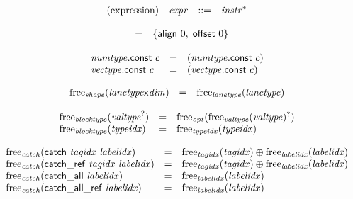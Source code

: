 \vspace{1ex}

$$
\begin{array}[t]{@{}lrrl@{}l@{}}
\mbox{(expression)} & {\mathit{expr}} & ::= & {{\mathit{instr}}^\ast} \\
\end{array}
$$

\vspace{1ex}

\vspace{1ex}

$$
\begin{array}[t]{@{}lcl@{}l@{}}
& = & \{ \mathsf{align}~0,\;\allowbreak \mathsf{offset}~0 \} \\
\end{array}
$$

$$
\begin{array}[t]{@{}lcl@{}l@{}}
{\mathit{numtype}}{.}\mathsf{const}~c & = & ({\mathit{numtype}}{.}\mathsf{const}~c) \\
{\mathit{vectype}}{.}\mathsf{const}~c & = & ({\mathit{vectype}}{.}\mathsf{const}~c) \\
\end{array}
$$

\vspace{1ex}

\vspace{1ex}

$$
\begin{array}[t]{@{}lcl@{}l@{}}
{\mathrm{free}}_{\mathit{shape}}({{\mathit{lanetype}}}{\mathsf{x}}{{\mathit{dim}}}) & = & {\mathrm{free}}_{\mathit{lanetype}}({\mathit{lanetype}}) \\
\end{array}
$$

$$
\begin{array}[t]{@{}lcl@{}l@{}}
{\mathrm{free}}_{\mathit{blocktype}}({{\mathit{valtype}}^?}) & = & {\mathrm{free}}_{\mathit{opt}}({{\mathrm{free}}_{\mathit{valtype}}({\mathit{valtype}})^?}) \\
{\mathrm{free}}_{\mathit{blocktype}}({\mathit{typeidx}}) & = & {\mathrm{free}}_{\mathit{typeidx}}({\mathit{typeidx}}) \\
\end{array}
$$

$$
\begin{array}[t]{@{}lcl@{}l@{}}
{\mathrm{free}}_{\mathit{catch}}(\mathsf{catch}~{\mathit{tagidx}}~{\mathit{labelidx}}) & = & {\mathrm{free}}_{\mathit{tagidx}}({\mathit{tagidx}}) \oplus {\mathrm{free}}_{\mathit{labelidx}}({\mathit{labelidx}}) \\
{\mathrm{free}}_{\mathit{catch}}(\mathsf{catch\_ref}~{\mathit{tagidx}}~{\mathit{labelidx}}) & = & {\mathrm{free}}_{\mathit{tagidx}}({\mathit{tagidx}}) \oplus {\mathrm{free}}_{\mathit{labelidx}}({\mathit{labelidx}}) \\
{\mathrm{free}}_{\mathit{catch}}(\mathsf{catch\_all}~{\mathit{labelidx}}) & = & {\mathrm{free}}_{\mathit{labelidx}}({\mathit{labelidx}}) \\
{\mathrm{free}}_{\mathit{catch}}(\mathsf{catch\_all\_ref}~{\mathit{labelidx}}) & = & {\mathrm{free}}_{\mathit{labelidx}}({\mathit{labelidx}}) \\
\end{array}
$$

